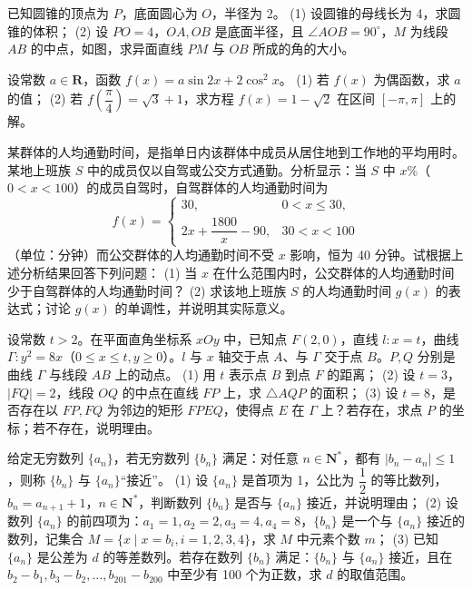 \Needspace{0.4\textheight}
\begin{question}
已知圆锥的顶点为 $P$，底面圆心为 $O$，半径为 2。
(1) 设圆锥的母线长为 4，求圆锥的体积；
(2) 设 $PO = 4$，$OA, OB$ 是底面半径，且 $\angle AOB = 90^\circ$，$M$ 为线段 $AB$ 的中点，如图，求异面直线 $PM$ 与 $OB$ 所成的角的大小。
\nopagebreak[4]
\begin{center}\end{center}
\nopagebreak[4]
\end{question}
\begin{question}
设常数 $a \in \mathbf{R}$，函数 $f(x) = a\sin 2x + 2\cos^2 x$。
(1) 若 $f(x)$ 为偶函数，求 $a$ 的值；
(2) 若 $f\left(\dfrac{\pi}{4}\right) = \sqrt{3} + 1$，求方程 $f(x) = 1 - \sqrt{2}$ 在区间 $[-\pi, \pi]$ 上的解。

\end{question}
\begin{question}
某群体的人均通勤时间，是指单日内该群体中成员从居住地到工作地的平均用时。某地上班族 $S$ 中的成员仅以自驾或公交方式通勤。分析显示：当 $S$ 中 $x\%$（$0 < x < 100$）的成员自驾时，自驾群体的人均通勤时间为
\nopagebreak[4]
\[f(x) = \begin{cases} 30, & 0 < x \le 30, \\ 2x + \dfrac{1800}{x} - 90, & 30 < x < 100 \end{cases}\]
（单位：分钟）而公交群体的人均通勤时间不受 $x$ 影响，恒为 40 分钟。试根据上述分析结果回答下列问题：
(1) 当 $x$ 在什么范围内时，公交群体的人均通勤时间少于自驾群体的人均通勤时间？
(2) 求该地上班族 $S$ 的人均通勤时间 $g(x)$ 的表达式；讨论 $g(x)$ 的单调性，并说明其实际意义。

\end{question}
\begin{question}
设常数 $t > 2$。在平面直角坐标系 $xOy$ 中，已知点 $F(2, 0)$，直线 $l: x = t$，曲线 $\Gamma: y^2 = 8x$（$0 \le x \le t, y \ge 0$）。$l$ 与 $x$ 轴交于点 $A$、与 $\Gamma$ 交于点 $B$。$P, Q$ 分别是曲线 $\Gamma$ 与线段 $AB$ 上的动点。
(1) 用 $t$ 表示点 $B$ 到点 $F$ 的距离；
(2) 设 $t = 3$，$|FQ| = 2$，线段 $OQ$ 的中点在直线 $FP$ 上，求 $\triangle AQP$ 的面积；
(3) 设 $t = 8$，是否存在以 $FP, FQ$ 为邻边的矩形 $FPEQ$，使得点 $E$ 在 $\Gamma$ 上？若存在，求点 $P$ 的坐标；若不存在，说明理由。

\end{question}
\begin{question}
给定无穷数列 $\{a_n\}$，若无穷数列 $\{b_n\}$ 满足：对任意 $n \in \mathbf{N}^*$，都有 $|b_n - a_n| \le 1$，则称 $\{b_n\}$ 与 $\{a_n\}$“接近”。
(1) 设 $\{a_n\}$ 是首项为 1，公比为 $\dfrac{1}{2}$ 的等比数列，$b_n = a_{n+1} + 1$，$n \in \mathbf{N}^*$，判断数列 $\{b_n\}$ 是否与 $\{a_n\}$ 接近，并说明理由；
(2) 设数列 $\{a_n\}$ 的前四项为：$a_1 = 1, a_2 = 2, a_3 = 4, a_4 = 8$，$\{b_n\}$ 是一个与 $\{a_n\}$ 接近的数列，记集合 $M = \{x \mid x = b_i, i = 1, 2, 3, 4\}$，求 $M$ 中元素个数 $m$；
(3) 已知 $\{a_n\}$ 是公差为 $d$ 的等差数列。若存在数列 $\{b_n\}$ 满足：$\{b_n\}$ 与 $\{a_n\}$ 接近，且在 $b_2 - b_1, b_3 - b_2, \dots, b_{201} - b_{200}$ 中至少有 100 个为正数，求 $d$ 的取值范围。

\end{question}